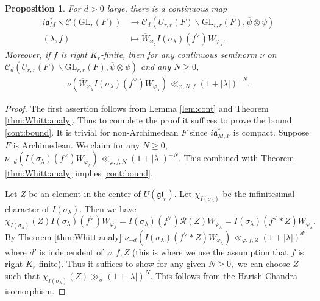 \documentclass[12pt]{amsart}
\newtheorem{prop}[thm]{Proposition}
\theoremstyle{remark}
\numberwithin{equation}{section}
\newcommand{\GL}{\mathrm{GL}}
\newcommand{\lto}{\longrightarrow}
\theoremstyle{definition}
\numberwithin{equation}{subsection}
\begin{document}
\begin{prop} \label{prop:unif}
For $d>0$ large, there is a continuous map
\begin{align*}
i\mathfrak{a}_M^* \times \mathcal{C}(\GL_r(F)) &\lto \mathcal{C}_d(U_{r,r}(F) \backslash \GL_{r,r}(F),\overline{\psi} \otimes \psi) \\
(\lambda,f) &\longmapsto \overline{W}_{\varphi_{\lambda}}I(\sigma_\lambda)(f^{\vee})W_{\varphi_{\lambda}}.
\end{align*}
Moreover, if $f$ is right $K_r$-finite, then for any continuous seminorm $\nu$ on $\mathcal{C}_d(U_{r,r}(F) \backslash \GL_{r,r}(F),\overline{\psi} \otimes \psi)$ and any $N \geq 0$,
\begin{align} \label{cont:bound}
\nu(\overline{W}_{\varphi_{\lambda}}I(\sigma_\lambda)(f^{\vee})W_{\varphi_{\lambda}}) \ll_{\varphi,N,f} (1+|\lambda|)^{-N}.
\end{align}
\end{prop}

\begin{proof}
The first assertion follows from Lemma \ref{lem:cont} and Theorem \ref{thm:Whitt:analy}. Thus to complete the proof it suffices to prove the bound \eqref{cont:bound}. It is trivial for non-Archimedean $F$ since $i\mathfrak{a}_{M,F}^*$  is compact. Suppose $F$ is Archimedean. We claim for any $N\ge 0$, $\nu_{-d}(I(\sigma_\lambda)(f^{\vee})W_{\varphi_{\lambda}})\ll_{\varphi,f,N} (1+|\lambda|)^{-N}.$  This combined with Theorem \ref{thm:Whitt:analy} implies \eqref{cont:bound}.

Let $Z$ be an element in the center of $U(\mathfrak{gl}_r).$ Let $\chi_{I(\sigma_\lambda)}$ be the infinitesimal character of $I(\sigma_\lambda).$  Then  we have
$$
\chi_{I(\sigma_\lambda)}(Z)I(\sigma_\lambda)(f^\vee)W_{\varphi_{\lambda}}= I(\sigma_\lambda)(f^\vee)\mathcal{R}(Z)W_{\varphi_{\lambda}}= I(\sigma_\lambda)(f^\vee*Z)W_{\varphi_{\lambda}}.
$$
By Theorem \ref{thm:Whitt:analy} $\nu_{-d}(I(\sigma_\lambda)(f^\vee*Z)W_{\varphi_\lambda}) \ll_{\varphi,f,Z}(1+|\lambda|)^{d'}$ where $d'$ is independent of $\varphi,f,Z$ (this is where we use the assumption that $f$ is right $K_r$-finite). Thus it suffices to show for any given $N\ge 0,$ we can choose $Z$ such that $\chi_{I(\sigma_\lambda)}(Z)\gg_{\sigma} (1+|\lambda|)^N$. This follows from the Harish-Chandra isomorphism.
\end{proof}
\end{document}
